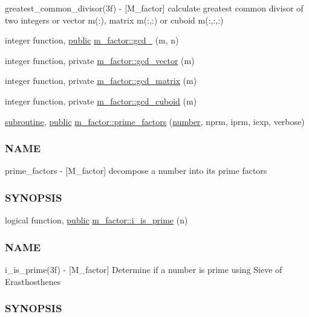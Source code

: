 \begin{DoxyCompactItemize}
\begin{DoxyCompactList}
greatest\+\_\+common\+\_\+divisor(3f) -\/ \mbox{[}M\+\_\+factor\mbox{]} calculate greatest common divisor of two integers or vector m(\+:), matrix m(\+:,\+:) or cuboid m(\+:,\+:,\+:) \end{DoxyCompactList}\item 
integer function, \hyperlink{M__stopwatch_83_8txt_a2f74811300c361e53b430611a7d1769f}{public} \hyperlink{namespacem__factor_aed74f995a7c71e8cec13964b82457403}{m\+\_\+factor\+::gcd\+\_} (m, n)
\item 
integer function, private \hyperlink{namespacem__factor_a60713d4c44895b4c18d4d6d9449ceaf7}{m\+\_\+factor\+::gcd\+\_\+vector} (m)
\item 
integer function, private \hyperlink{namespacem__factor_a6edfef428cb51a2cbe97cfb0ad25da8b}{m\+\_\+factor\+::gcd\+\_\+matrix} (m)
\item 
integer function, private \hyperlink{namespacem__factor_aff0e6f81edd8efc0fe41822916fb4efa}{m\+\_\+factor\+::gcd\+\_\+cuboid} (m)
\item 
\hyperlink{M__stopwatch_83_8txt_acfbcff50169d691ff02d4a123ed70482}{subroutine}, \hyperlink{M__stopwatch_83_8txt_a2f74811300c361e53b430611a7d1769f}{public} \hyperlink{namespacem__factor_a6440013d17b820fa65096b34f21d367d}{m\+\_\+factor\+::prime\+\_\+factors} (\hyperlink{what__overview_81_8txt_a5168680dcac08de182f59de9a12c38ae}{number}, nprm, iprm, iexp, verbose)
\begin{DoxyCompactList}\small\item\em \subsubsection*{N\+A\+ME}

prime\+\_\+factors -\/ \mbox{[}M\+\_\+factor\mbox{]} decompose a number into its prime factors \subsubsection*{S\+Y\+N\+O\+P\+S\+IS}\end{DoxyCompactList}\item 
logical function, \hyperlink{M__stopwatch_83_8txt_a2f74811300c361e53b430611a7d1769f}{public} \hyperlink{namespacem__factor_afcca43d3d524f6d11d54bbfd475e60d5}{m\+\_\+factor\+::i\+\_\+is\+\_\+prime} (n)
\begin{DoxyCompactList}\small\item\em \subsubsection*{N\+A\+ME}

i\+\_\+is\+\_\+prime(3f) -\/ \mbox{[}M\+\_\+factor\mbox{]} Determine if a number is prime using Sieve of Erasthosthenes \subsubsection*{S\+Y\+N\+O\+P\+S\+IS}\end{DoxyCompactList}\end{DoxyCompactItemize}
